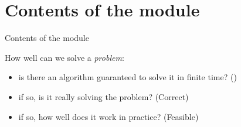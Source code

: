 \documentclass[aspectratio=169]{beamer}
\begin{document}







\section{Contents of the module}


\begin{frame}{Contents of the module }

  How well can we solve a \emph{problem}:
  \begin{itemize}
    \item is there an algorithm guaranteed to solve it in finite time? ()
    \item if so, is it really solving the problem? (\alert{Correct})
    \item if so, how well does it work in practice? (\alert{Feasible})
  \end{itemize}


  ~\\

\end{frame}
\end{document}
